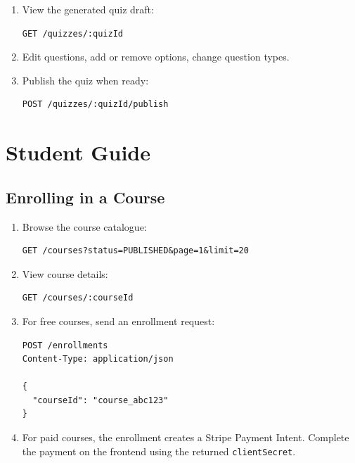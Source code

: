\begin{enumerate}
  \item View the generated quiz draft:

\begin{lstlisting}[caption=View AI-generated quiz,label=lst:guide-view-ai-quiz]
GET /quizzes/:quizId
\end{lstlisting}

  \item Edit questions, add or remove options, change question types.
  \item Publish the quiz when ready:

\begin{lstlisting}[caption=Publish quiz,label=lst:guide-publish-quiz]
POST /quizzes/:quizId/publish
\end{lstlisting}
\end{enumerate}

\section{Student Guide}
\label{sec:app-student-guide}

\subsection{Enrolling in a Course}

\begin{enumerate}
  \item Browse the course catalogue:

\begin{lstlisting}[caption=List published courses,label=lst:guide-list-courses]
GET /courses?status=PUBLISHED&page=1&limit=20
\end{lstlisting}

  \item View course details:

\begin{lstlisting}[caption=View course,label=lst:guide-view-course]
GET /courses/:courseId
\end{lstlisting}

  \item For free courses, send an enrollment request:

\begin{lstlisting}[caption=Enroll in free course,label=lst:guide-enroll-free]
POST /enrollments
Content-Type: application/json

{
  "courseId": "course_abc123"
}
\end{lstlisting}

  \item For paid courses, the enrollment creates a Stripe Payment Intent. Complete the payment on the frontend using the returned \texttt{clientSecret}.
\end{enumerate}

